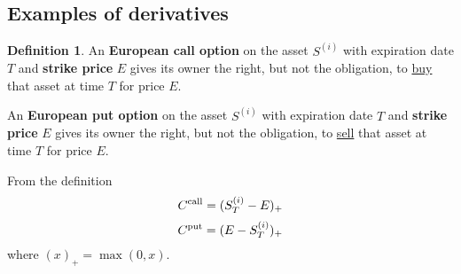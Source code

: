 \documentclass[a4paper,11pt, twoside]{book}
\theoremstyle{definition}
\newtheorem{mydef}{Definition}[chapter]
\theoremstyle{remark}
\begin{document}
\subsection{Examples of derivatives}
\begin{mydef}
 An \textbf{European call option} on the asset $S^{(i)}$ with expiration date $T$ and \textbf{strike price} $E$ gives its owner the right, but not the obligation, to \underline{buy} that asset at time $T$ for price $E$.
 
 An \textbf{European put option} on the asset $S^{(i)}$ with expiration date $T$ and \textbf{strike price} $E$ gives its owner the right, but not the obligation, to \underline{sell} that asset at time $T$ for price $E$.
\end{mydef}
From the definition
\begin{equation}
 \label{eq:ecall}
 C\textsuperscript{call} = (S^{(i)}_T - E)_+
\end{equation}
\begin{equation}
 \label{eq:eput}
 C\textsuperscript{put} = (E - S^{(i)}_T )_+
\end{equation}
where $(x)_+ = \max(0,x)$.
\end{document}
